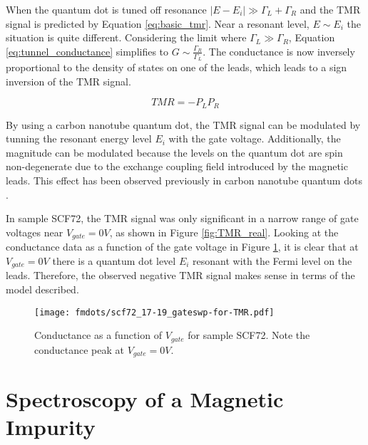 When the quantum dot is tuned off resonance $|E-E_i| \gg \Gamma_L + \Gamma_R$ and the TMR signal is predicted by Equation \ref{eq:basic_tmr}. Near a resonant level, $E \sim E_i$ the situation is quite different. Considering the limit where $\Gamma_L \gg \Gamma_R$, Equation \ref{eq:tunnel_conductance} simplifies to $G \sim \frac{\Gamma_R}{\Gamma_L}$. The conductance is now inversely proportional to the density of states on one of the leads, which leads to a sign inversion of the TMR signal.

\begin{equation}
\label{eq:sign_inversion}
    TMR = -P_L P_R
\end{equation}

By using a carbon nanotube quantum dot, the TMR signal can be modulated by tunning the resonant energy level $E_i$ with the gate voltage. Additionally, the magnitude can be modulated because the levels on the quantum dot are spin non-degenerate due to the exchange coupling field introduced by the magnetic leads. This effect has been observed previously in carbon nanotube quantum dots \cite{Sahoo2005, Thamankar2006}. 

In sample SCF72, the TMR signal was only significant in a narrow range of gate voltages near $V_{gate}=0V$, as shown in Figure \ref{fig:TMR_real}. Looking at the conductance data as a function of the gate voltage in Figure \ref{fig:TMR_gate}, it is clear that at $V_{gate}=0V$ there is a quantum dot level $E_i$ resonant with the Fermi level on the leads. Therefore, the observed negative TMR signal makes sense in terms of the model described.

\begin{figure}
    \centering
    \texttt{[image: fmdots/scf72\_17-19\_gateswp-for-TMR.pdf]}
    \caption{Conductance as a function of $V_{gate}$ for sample SCF72. Note the conductance peak at $V_{gate}=0V$.}
    \label{fig:TMR_gate}
\end{figure}


%


\section{Spectroscopy of a Magnetic Impurity}
\label{sec:imurity_tunneling}

